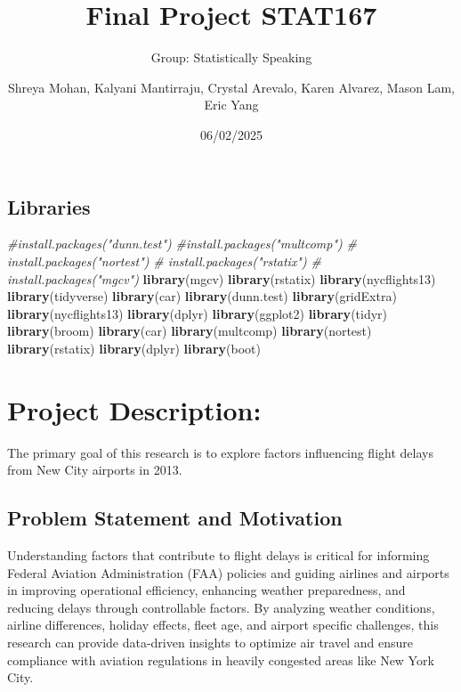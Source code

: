 \documentclass[
]{article}
\title{Final Project STAT167}
\author{Group: Statistically Speaking \and Shreya Mohan, Kalyani
Mantirraju, Crystal Arevalo, Karen Alvarez, Mason Lam, Eric Yang}
\date{06/02/2025}
\newenvironment{Shaded}{\begin{snugshade}}{\end{snugshade}}
\newcommand{\CommentTok}[1]{\textcolor[rgb]{0.56,0.35,0.01}{\textit{#1}}}
\newcommand{\FunctionTok}[1]{\textcolor[rgb]{0.13,0.29,0.53}{\textbf{#1}}}
\newcommand{\NormalTok}[1]{#1}
\begin{document}
\maketitle

\subsection{Libraries}\label{libraries}

\begin{Shaded}
\begin{Highlighting}[]
\CommentTok{\#install.packages("dunn.test")}
\CommentTok{\#install.packages("multcomp")}
\CommentTok{\# install.packages("nortest")}
\CommentTok{\# install.packages("rstatix")}
\CommentTok{\# install.packages("mgcv")}
\FunctionTok{library}\NormalTok{(mgcv)}
\FunctionTok{library}\NormalTok{(rstatix)}
\FunctionTok{library}\NormalTok{(nycflights13)}
\FunctionTok{library}\NormalTok{(tidyverse)}
\FunctionTok{library}\NormalTok{(car)}
\FunctionTok{library}\NormalTok{(dunn.test)}
\FunctionTok{library}\NormalTok{(gridExtra)}
\FunctionTok{library}\NormalTok{(nycflights13)}
\FunctionTok{library}\NormalTok{(dplyr)}
\FunctionTok{library}\NormalTok{(ggplot2)}
\FunctionTok{library}\NormalTok{(tidyr)}
\FunctionTok{library}\NormalTok{(broom)}
\FunctionTok{library}\NormalTok{(car) }
\FunctionTok{library}\NormalTok{(multcomp)}
\FunctionTok{library}\NormalTok{(nortest)}
\FunctionTok{library}\NormalTok{(rstatix)}
\FunctionTok{library}\NormalTok{(dplyr)}
\FunctionTok{library}\NormalTok{(boot)}
\end{Highlighting}
\end{Shaded}

\section{Project Description:}\label{project-description}

The primary goal of this research is to explore factors influencing
flight delays from New City airports in 2013.

\subsection{Problem Statement and
Motivation}\label{problem-statement-and-motivation}

Understanding factors that contribute to flight delays is critical for
informing Federal Aviation Administration (FAA) policies and guiding
airlines and airports in improving operational efficiency, enhancing
weather preparedness, and reducing delays through controllable factors.
By analyzing weather conditions, airline differences, holiday effects,
fleet age, and airport specific challenges, this research can provide
data-driven insights to optimize air travel and ensure compliance with
aviation regulations in heavily congested areas like New York City.
\end{document}
